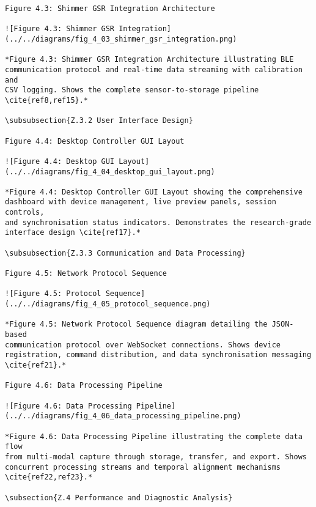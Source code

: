 \begin{verbatim}
Figure 4.3: Shimmer GSR Integration Architecture

![Figure 4.3: Shimmer GSR Integration](../../diagrams/fig_4_03_shimmer_gsr_integration.png)

*Figure 4.3: Shimmer GSR Integration Architecture illustrating BLE
communication protocol and real-time data streaming with calibration and
CSV logging. Shows the complete sensor-to-storage pipeline \cite{ref8,ref15}.*

\subsubsection{Z.3.2 User Interface Design}

Figure 4.4: Desktop Controller GUI Layout

![Figure 4.4: Desktop GUI Layout](../../diagrams/fig_4_04_desktop_gui_layout.png)

*Figure 4.4: Desktop Controller GUI Layout showing the comprehensive
dashboard with device management, live preview panels, session controls,
and synchronisation status indicators. Demonstrates the research-grade
interface design \cite{ref17}.*

\subsubsection{Z.3.3 Communication and Data Processing}

Figure 4.5: Network Protocol Sequence

![Figure 4.5: Protocol Sequence](../../diagrams/fig_4_05_protocol_sequence.png)

*Figure 4.5: Network Protocol Sequence diagram detailing the JSON-based
communication protocol over WebSocket connections. Shows device
registration, command distribution, and data synchronisation messaging
\cite{ref21}.*

Figure 4.6: Data Processing Pipeline

![Figure 4.6: Data Processing Pipeline](../../diagrams/fig_4_06_data_processing_pipeline.png)

*Figure 4.6: Data Processing Pipeline illustrating the complete data flow
from multi-modal capture through storage, transfer, and export. Shows
concurrent processing streams and temporal alignment mechanisms \cite{ref22,ref23}.*

\subsection{Z.4 Performance and Diagnostic Analysis}


\end{verbatim}
